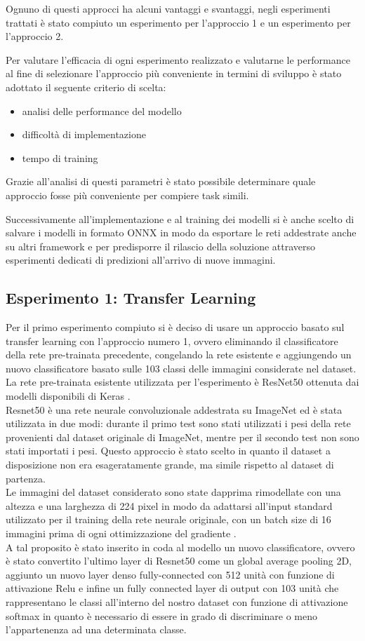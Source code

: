 Ognuno di questi approcci ha alcuni vantaggi e svantaggi, negli esperimenti trattati è stato compiuto un esperimento per l'approccio 1 e un esperimento per l'approccio 2. \bigskip

Per valutare l'efficacia di ogni esperimento realizzato e valutarne le performance al fine di selezionare l'approccio più conveniente in termini di sviluppo è stato adottato il seguente criterio di scelta:  
\begin{itemize}
\item analisi delle performance del modello
\item difficoltà di implementazione
\item tempo di training
\end{itemize}
Grazie all'analisi di questi parametri è stato possibile determinare quale approccio fosse più conveniente per compiere task simili.  
\bigskip

Successivamente all'implementazione e al training dei modelli si è anche scelto di salvare i modelli in formato ONNX in modo da esportare le reti addestrate anche su altri framework e per predisporre il rilascio della soluzione attraverso esperimenti dedicati di predizioni all'arrivo di nuove immagini. 

\subsection{Esperimento 1: Transfer Learning}
Per il primo esperimento compiuto si è deciso di usare un approccio basato sul transfer learning con l'approccio numero 1, ovvero eliminando il classificatore della rete pre-trainata precedente, congelando la rete esistente e aggiungendo un nuovo classificatore basato sulle 103 classi delle immagini considerate nel dataset.  
La rete pre-trainata esistente utilizzata per l'esperimento è ResNet50 \cite{resnet50} ottenuta dai modelli disponibili di Keras \cite{keras_resnet50}. \\
Resnet50 è una rete neurale convoluzionale addestrata su ImageNet ed è stata utilizzata in due modi: durante il primo test sono stati utilizzati i pesi della rete provenienti dal dataset originale di ImageNet, mentre per il secondo test non sono stati importati i pesi.  
Questo approccio è stato scelto in quanto il dataset a disposizione non era esageratamente grande, ma simile rispetto al dataset di partenza. \\
Le immagini del dataset considerato sono state dapprima rimodellate con una altezza e una larghezza di 224 pixel in modo da adattarsi all'input standard utilizzato per il training della rete neurale originale, con un batch size di 16 immagini prima di ogni ottimizzazione del gradiente \cite{batch_size}.\\
A tal proposito è stato inserito in coda al modello un nuovo classificatore, ovvero è stato convertito l'ultimo layer di Resnet50 come un global average pooling 2D, aggiunto un nuovo layer denso fully-connected con 512 unità con funzione di attivazione Relu e infine un fully connected layer di output con 103 unità che rappresentano le classi all'interno del nostro dataset con funzione di attivazione softmax in quanto è necessario di essere in grado di discriminare o meno l'appartenenza ad una determinata classe. \bigskip

